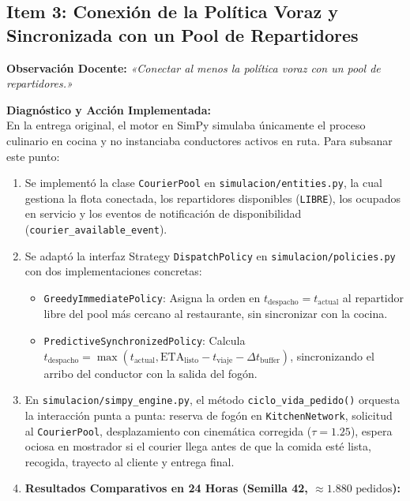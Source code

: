 \documentclass[11pt,letterpaper]{article}
\begin{document}
\subsection{Item 3: Conexión de la Política Voraz y Sincronizada con un Pool de Repartidores}
\noindent \textbf{Observación Docente:} \textit{«Conectar al menos la política voraz con un pool de repartidores.»}

\vspace{0.4em}
\noindent \textbf{Diagnóstico y Acción Implementada:} \\
En la entrega original, el motor en SimPy simulaba únicamente el proceso culinario en cocina y no instanciaba conductores activos en ruta. Para subsanar este punto:
\begin{enumerate}[leftmargin=1.5em, itemsep=0.2em]
    \item Se implementó la clase \texttt{CourierPool} en \texttt{simulacion/entities.py}, la cual gestiona la flota conectada, los repartidores disponibles (\texttt{LIBRE}), los ocupados en servicio y los eventos de notificación de disponibilidad (\texttt{courier\_available\_event}).
    \item Se adaptó la interfaz Strategy \texttt{DispatchPolicy} en \texttt{simulacion/policies.py} con dos implementaciones concretas:
    \begin{itemize}[leftmargin=1.2em]
        \item \texttt{GreedyImmediatePolicy}: Asigna la orden en $t_{\text{despacho}} = t_{\text{actual}}$ al repartidor libre del pool más cercano al restaurante, sin sincronizar con la cocina.
        \item \texttt{PredictiveSynchronizedPolicy}: Calcula $t_{\text{despacho}} = \max(t_{\text{actual}}, \text{ETA}_{\text{listo}} - t_{\text{viaje}} - \Delta t_{\text{buffer}})$, sincronizando el arribo del conductor con la salida del fogón.
    \end{itemize}
    \item En \texttt{simulacion/simpy\_engine.py}, el método \texttt{ciclo\_vida\_pedido()} orquesta la interacción punta a punta: reserva de fogón en \texttt{KitchenNetwork}, solicitud al \texttt{CourierPool}, desplazamiento con cinemática corregida ($\tau = 1.25$), espera ociosa en mostrador si el courier llega antes de que la comida esté lista, recogida, trayecto al cliente y entrega final.
    \item \textbf{Resultados Comparativos en 24 Horas (Semilla 42, $\approx 1.880\text{ pedidos}$):}
    \begin{itemize}[leftmargin=1.2em]

\end{itemize}
\end{enumerate}
\end{document}
